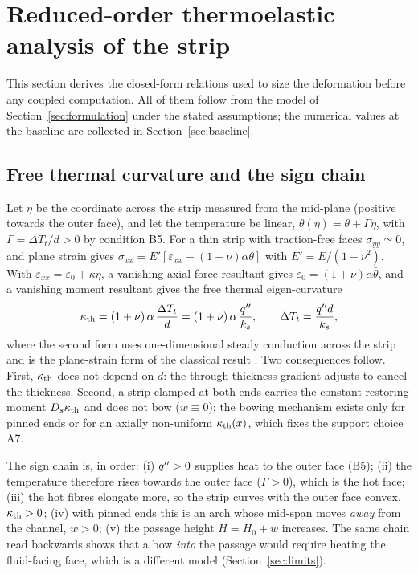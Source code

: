\section{Reduced-order thermoelastic analysis of the strip}
\label{sec:reduced}

This section derives the closed-form relations used to size the deformation before any coupled
computation. All of them follow from the model of Section~\ref{sec:formulation} under the stated
assumptions; the numerical values at the baseline are collected in Section~\ref{sec:baseline}.

\subsection{Free thermal curvature and the sign chain}
\label{sec:freecurv}
Let $\eta$ be the coordinate across the strip measured from the mid-plane (positive towards the outer
face), and let the temperature be linear,
$\theta(\eta)=\bar\theta+\Gamma\eta$, with $\Gamma=\Delta T_t/d>0$ by condition B5. For a thin strip with
traction-free faces $\sigma_{yy}\simeq0$, and plane strain gives
$\sigma_{xx}=E'[\varepsilon_{xx}-(1+\nu)\alpha\theta]$ with $E'=E/(1-\nu^2)$. With
$\varepsilon_{xx}=\varepsilon_0+\kappa\eta$, a vanishing axial force resultant gives
$\varepsilon_0=(1+\nu)\alpha\bar\theta$, and a vanishing moment resultant gives the free thermal
eigen-curvature
\begin{equation}
\kappa_{\mathrm{th}}=(1+\nu)\,\alpha\,\frac{\Delta T_t}{d}=(1+\nu)\,\alpha\,\frac{q^{\prime\prime}}{k_s},
\qquad \Delta T_t=\frac{q^{\prime\prime} d}{k_s}, \label{eq:kappa}
\end{equation}
where the second form uses one-dimensional steady conduction across the strip
\citep{carslaw1947conduction} and is the plane-strain form of the classical result
\citep{boley1960theory}. Two consequences follow. First, $\kappa_{\mathrm{th}}$ does not depend on $d$: the
through-thickness gradient adjusts to cancel the thickness. Second, a strip clamped at both ends
carries the constant restoring moment $D_s\kappa_{\mathrm{th}}$ and does not bow ($w\equiv0$); the bowing
mechanism exists only for pinned ends or for an axially non-uniform $\kappa_{\mathrm{th}}(x)$, which fixes the
support choice A7.

The sign chain is, in order: (i) $q^{\prime\prime}>0$ supplies heat to the outer face (B5); (ii) the temperature
therefore rises towards the outer face ($\Gamma>0$), which is the hot face; (iii) the hot fibres
elongate more, so the strip curves with the outer face convex, $\kappa_{\mathrm{th}}>0$; (iv) with pinned ends this
is an arch whose mid-span moves \emph{away} from the channel, $w>0$; (v) the passage height
$H=H_0+w$ increases. The same chain read backwards shows that a bow \emph{into} the passage
would require heating the fluid-facing face, which is a different model (Section~\ref{sec:limits}).

